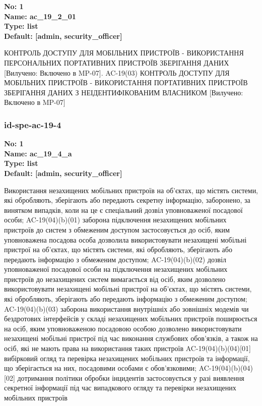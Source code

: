 \documentclass{article}
\begin{document}
\vspace{10pt}
{\footnotesize\bfseries
No: 1\\
Name: ac\_\allowbreak{}19\_\allowbreak{}2\_\allowbreak{}01\\
Type: list\\
Default: [\textquotedbl{}admin\textquotedbl{}, \textquotedbl{}security\_\allowbreak{}officer\textquotedbl{}]
}

{\footnotesize КОНТРОЛЬ ДОСТУПУ ДЛЯ МОБІЛЬНИХ ПРИСТРОЇВ - ВИКОРИСТАННЯ ПЕРСОНАЛЬНИХ ПОРТАТИВНИХ ПРИСТРОЇВ ЗБЕРІГАННЯ ДАНИХ [Вилучено: Включено в MP-07]. AC-19(03) КОНТРОЛЬ ДОСТУПУ ДЛЯ МОБІЛЬНИХ ПРИСТРОЇВ - ВИКОРИСТАННЯ ПОРТАТИВНИХ ПРИСТРОЇВ ЗБЕРІГАННЯ ДАНИХ З НЕІДЕНТИФІКОВАНИМ ВЛАСНИКОМ [Вилучено: Включено в MP-07]}




\subsubsection{id-spe-ac-19-4}


\vspace{10pt}
{\footnotesize\bfseries
No: 1\\
Name: ac\_\allowbreak{}19\_\allowbreak{}4\_\allowbreak{}a\\
Type: list\\
Default: [\textquotedbl{}admin\textquotedbl{}, \textquotedbl{}security\_\allowbreak{}officer\textquotedbl{}]
}

{\footnotesize Використання незахищених мобільних пристроїв на об'єктах, що містять системи, які обробляють, зберігають або передають секретну інформацію, заборонено, за винятком випадків, коли на це є спеціальний дозвіл уповноваженої посадової особи; AC-19(04)(b)(01) заборона підключення незахищених мобільних пристроїв до систем з обмеженим доступом застосовується до осіб, яким уповноважена посадова особа дозволила використовувати незахищені мобільні пристрої на об'єктах, що містять системи, які обробляють, зберігають або передають інформацію з обмеженим доступом; AC-19(04)(b)(02) дозвіл уповноваженої посадової особи на підключення незахищених мобільних пристроїв до незахищених систем вимагається від осіб, яким дозволено використовувати незахищені мобільні пристрої на об'єктах, що містять системи, які обробляють, зберігають або передають інформацію з обмеженим доступом; AC-19(04)(b)(03) заборона використання внутрішніх або зовнішніх модемів чи бездротових інтерфейсів у складі незахищених мобільних пристроїв поширюється на осіб, яким уповноваженою посадовою особою дозволено використовувати незахищені мобільні пристрої під час виконання службових обов'язків, а також на осіб, які не мають права на використання таких пристроїв AC-19(04)(b)(04)[01] вибірковий огляд та перевірка незахищених мобільних пристроїв та інформації, що зберігається на них, посадовими особами є обов'язковими; AC-19(04)(b)(04)[02] дотримання політики обробки інцидентів застосовується у разі виявлення секретної інформації під час випадкового огляду та перевірки незахищених мобільних пристроїв}
\end{document}
